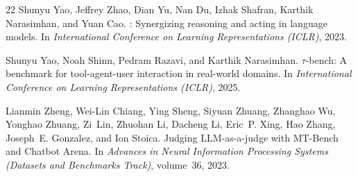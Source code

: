 \begin{thebibliography}{22}
Shunyu Yao, Jeffrey Zhao, Dian Yu, Nan Du, Izhak Shafran, Karthik Narasimhan,
  and Yuan Cao.
: Synergizing reasoning and acting in language models.
\newblock In \emph{International Conference on Learning Representations
  (ICLR)}, 2023.

Shunyu Yao, Noah Shinn, Pedram Razavi, and Karthik Narasimhan.
\newblock $\tau$-bench: A benchmark for tool-agent-user interaction in
  real-world domains.
\newblock In \emph{International Conference on Learning Representations
  (ICLR)}, 2025.

Lianmin Zheng, Wei-Lin Chiang, Ying Sheng, Siyuan Zhuang, Zhanghao Wu, Yonghao
  Zhuang, Zi~Lin, Zhuohan Li, Dacheng Li, Eric~P. Xing, Hao Zhang, Joseph~E.
  Gonzalez, and Ion Stoica.
\newblock Judging {LLM}-as-a-judge with {MT-Bench} and {Chatbot Arena}.
\newblock In \emph{Advances in Neural Information Processing Systems (Datasets
  and Benchmarks Track)}, volume~36, 2023.

\end{thebibliography}
